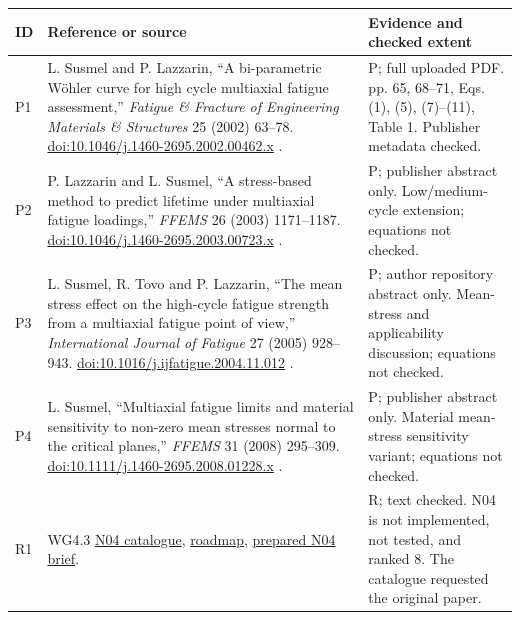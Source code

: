 \documentclass[10pt,a4paper]{article}
\newcommand{\sct}[1]{\needspace{5\baselineskip}\vspace{7pt}{\large\bfseries\color{ink}#1}\par\vspace{2pt}}
\begin{document}
\sct{B  Source register and method identity}\label{sec:sources}
\small
\begin{longtable}{@{}p{9mm}p{89mm}p{58mm}@{}}
\toprule ID & Reference or source & Evidence and checked extent\\\midrule
\endhead
P1 & L. Susmel and P. Lazzarin, ``A bi-parametric W\"ohler curve for high cycle multiaxial fatigue assessment,'' \emph{Fatigue \& Fracture of Engineering Materials \& Structures} 25 (2002) 63--78. \href{https://doi.org/10.1046/j.1460-2695.2002.00462.x}{doi:10.1046/j.1460-2695.2002.00462.x} \cite{susmel2002}. & P; full uploaded PDF. pp. 65, 68--71, Eqs. (1), (5), (7)--(11), Table 1. Publisher metadata checked.\\
P2 & P. Lazzarin and L. Susmel, ``A stress-based method to predict lifetime under multiaxial fatigue loadings,'' \emph{FFEMS} 26 (2003) 1171--1187. \href{https://doi.org/10.1046/j.1460-2695.2003.00723.x}{doi:10.1046/j.1460-2695.2003.00723.x} \cite{lazzarin2003}. & P; publisher abstract only. Low/medium-cycle extension; equations not checked.\\
P3 & L. Susmel, R. Tovo and P. Lazzarin, ``The mean stress effect on the high-cycle fatigue strength from a multiaxial fatigue point of view,'' \emph{International Journal of Fatigue} 27 (2005) 928--943. \href{https://doi.org/10.1016/j.ijfatigue.2004.11.012}{doi:10.1016/j.ijfatigue.2004.11.012} \cite{susmel2005}. & P; author repository abstract only. Mean-stress and applicability discussion; equations not checked.\\
P4 & L. Susmel, ``Multiaxial fatigue limits and material sensitivity to non-zero mean stresses normal to the critical planes,'' \emph{FFEMS} 31 (2008) 295--309. \href{https://doi.org/10.1111/j.1460-2695.2008.01228.x}{doi:10.1111/j.1460-2695.2008.01228.x} \cite{susmel2008}. & P; publisher abstract only. Material mean-stress sensitivity variant; equations not checked.\\
R1 & WG4.3 \href{https://github.com/andreachiocca/multiaxial-fatigue/blob/1ffb8896d1447e9f9f40f37f0c8c7dd08a563251/METHODS.md\#n04}{N04 catalogue}, \href{https://github.com/andreachiocca/multiaxial-fatigue/blob/1ffb8896d1447e9f9f40f37f0c8c7dd08a563251/ROADMAP.md}{roadmap}, \href{https://github.com/andreachiocca/multiaxial-fatigue/blob/1ffb8896d1447e9f9f40f37f0c8c7dd08a563251/docs/contribution-issues/N04.md}{prepared N04 brief}. & R; text checked. N04 is not implemented, not tested, and ranked 8. The catalogue requested the original paper.\\
\bottomrule
\end{longtable}
\normalsize
\end{document}
